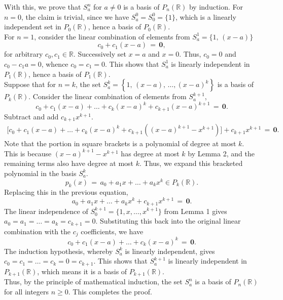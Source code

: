 \documentclass[10pt]{article}
\begin{document}
        With this, we prove that $S_a^n$ for $a \neq 0$ is a basis of $P_n(\mathbb{R})$ by induction. 
        For $n = 0$, the claim is trivial, since we have $S_a^0 = S_0^0 = \{1\}$, which is a linearly independent set in $P_0(\mathbb{R})$,
        hence a basis of $P_0(\mathbb{R})$. \\

        For $n = 1$, consider the linear combination of elements from $S_a^1 = \{1,\, (x - a)\}$
        \[
                c_0 + c_1(x - a) \,=\, \mathbf{0},
        \]
        for arbitrary $c_0, c_1 \in \mathbb{R}$.
        Successively set $x = a$ and $x = 0$.
        Thus, $c_0 = 0$ and $c_0 - c_1a = 0$, whence $c_0 = c_1 = 0$.
        This shows that $S_a^1$ is linearly independent in $P_1(\mathbb{R})$, hence a basis of $P_1(\mathbb{R})$. \\

        Suppose that for $n = k$, the set $S_a^k = \left\{1,\, (x - a),\, \dots, (x - a)^k\right\}$ is a basis of $P_k(\mathbb{R})$.
        Consider the linear combination of elements from $S_a^{k + 1}$,
        \[
                c_0 + c_1(x - a) + \dots + c_k(x - a)^k + c_{k + 1}(x - a)^{k + 1} \,=\, \mathbf{0}.
        \]
        Subtract and add $c_{k + 1}x^{k + 1}$.
        \begin{align*}
                \Big[c_0 + c_1(x - a) + \dots 
                + c_k(x - a)^k + c_{k + 1}\left((x - a)^{k + 1} - x^{k + 1}\right)\Big] + c_{k + 1}x^{k + 1} \,=\, \mathbf{0}.
        \end{align*}
        Note that the portion in square brackets is a polynomial of degree at most $k$.
        This is because $(x - a)^{k + 1} - x^{k + 1}$ has degree at most $k$ by Lemma 2, and the remaining terms also have degree at most $k$.
        Thus, we expand this bracketed polynomial in the basis $S_a^k$.
        \[
                p_k(x) \,=\, a_0 + a_1x + \dots + a_kx^k \in P_k(\mathbb{R}).
        \]
        Replacing this in the previous equation,
        \[
                a_0 + a_1x + \dots + a_kx^k + c_{k + 1}x^{k + 1} \,=\, \mathbf{0}.
        \]
        The linear independence of $S_0^{k + 1} = \{1, x, \dots, x^{k + 1}\}$ from Lemma 1 gives $a_0 = a_1 = \dots = a_k = c_{k + 1} = 0$.
        Substituting this back into the original linear combination with the $c_j$ coefficients, we have
        \[
                c_0 + c_1(x - a) + \dots + c_k(x - a)^k \,=\, \mathbf{0}.
        \]
        The induction hypothesis, whereby $S_a^k$ is linearly independent, gives $c_0 = c_1 = \dots = c_k = 0 = c_{k + 1}$.
        This shows that $S_a^{k + 1}$ is linearly independent in $P_{k + 1}(\mathbb{R})$, which means it is a basis of $P_{k + 1}(\mathbb{R})$. \\

        Thus, by the principle of mathematical induction, the set $S_a^n$ is a basis of $P_n(\mathbb{R})$ for all integers $n \geq 0$.
        This completes the proof.
\end{document}
